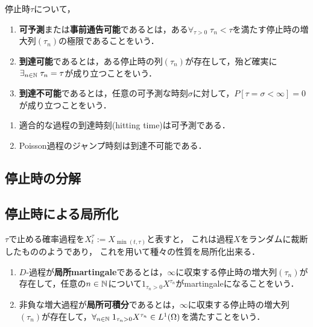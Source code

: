 \documentclass[uplatex,dvipdfmx]{jsreport}
\begin{document}
\begin{definition}
    停止時$\tau$について，
    \begin{enumerate}
        \item \textbf{可予測}または\textbf{事前通告可能}であるとは，ある$\forall_{\tau>0}\;\tau_n<\tau$を満たす停止時の増大列$(\tau_n)$の極限であることをいう．
        \item \textbf{到達可能}であるとは，ある停止時の列$(\tau_n)$が存在して，殆ど確実に$\exists_{n\in\mathbb{N}}\;\tau_n=\tau$が成り立つことをいう．
        \item \textbf{到達不可能}であるとは，任意の可予測な時刻$\sigma$に対して，$P[\tau=\sigma<\infty]=0$が成り立つことをいう．
    \end{enumerate}
\end{definition}
\begin{example}\mbox{}
    \begin{enumerate}
        \item 適合的な過程の到達時刻(hitting time)は可予測である．
        \item Poisson過程のジャンプ時刻は到達不可能である．
    \end{enumerate}
\end{example}

\subsection{停止時の分解}

\begin{theorem}[停止時の分解]
    
\end{theorem}

\subsection{停止時による局所化}

\begin{tcolorbox}[colframe=ForestGreen, colback=ForestGreen!10!white,breakable,colbacktitle=ForestGreen!40!white,coltitle=black,fonttitle=\bfseries\sffamily,
title=]
    $\tau$で止める確率過程を$X^\tau_t:=X_{\min(t,\tau)}$と表すと，
    これは過程$X$をランダムに裁断したもののようであり，
    これを用いて種々の性質を局所化出来る．
\end{tcolorbox}

\begin{definition}\mbox{}
    \begin{enumerate}
        \item $D$-過程が\textbf{局所martingale}であるとは，$\infty$に収束する停止時の増大列$(\tau_n)$が存在して，任意の$n\in\mathbb{N}$について$1_{\tau_n>0}X^{\tau_n}$がmartingaleになることをいう．
        \item 非負な増大過程が\textbf{局所可積分}であるとは，$\infty$に収束する停止時の増大列$(\tau_n)$が存在して，$\forall_{n\in\mathbb{N}}\;1_{\tau_n>0}X^{\tau_n}\in L^1(\Omega)$を満たすことをいう．
    \end{enumerate}
\end{definition}
\end{document}
